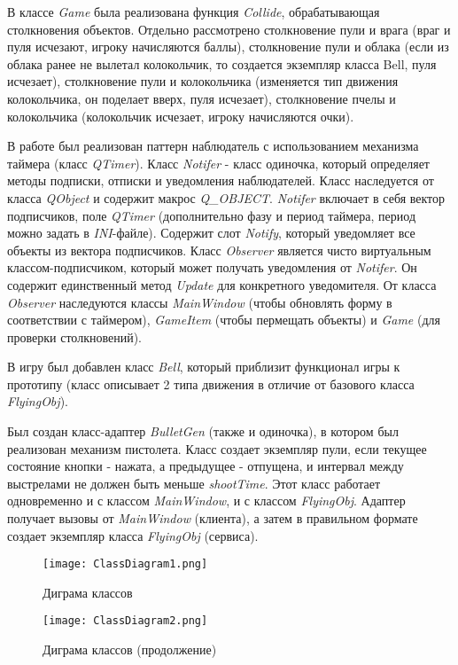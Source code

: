 \documentclass[a4paper,14pt]{article}
\begin{document}
В классе \textit{Game} была реализована функция \textit{Collide}, обрабатывающая столкновения объектов. Отдельно рассмотрено столкновение пули и врага (враг и пуля исчезают, игроку начисляются баллы), столкновение пули и облака (если из облака ранее не вылетал колокольчик, то создается экземпляр класса Bell, пуля исчезает), столкновение пули и колокольчика (изменяется тип движения колокольчика, он поделает вверх, пуля исчезает), столкновение пчелы и колокольчика (колокольчик исчезает, игроку начисляются очки).

В работе был реализован паттерн наблюдатель с использованием механизма таймера (класс \textit{QTimer}). Класс \textit{Notifer} - класс одиночка, который определяет методы подписки, отписки и уведомления наблюдателей. Класс наследуется от класса \textit{QObject} и содержит макрос \textit{Q\_OBJECT}. \textit{Notifer} включает в себя вектор подписчиков, поле \textit{QTimer} (дополнительно фазу и период таймера, период можно задать в \textit{INI}-файле). Содержит слот \textit{Notify}, который уведомляет все объекты из вектора подписчиков. Класс \textit{Observer} является чисто виртуальным классом-подписчиком, который может получать уведомления от \textit{Notifer}. Он содержит единственный метод \textit{Update} для конкретного уведомителя. От класса \textit{Observer} наследуются классы \textit{MainWindow} (чтобы обновлять форму в соответствии с таймером), \textit{GameItem} (чтобы пермещать объекты) и \textit{Game} (для проверки столкновений).

В игру был добавлен класс \textit{Bell}, который приблизит функционал игры к прототипу (класс описывает 2 типа движения в отличие от базового класса \textit{FlyingObj}). 

Был создан класс-адаптер \textit{BulletGen} (также и одиночка), в котором был реализован механизм пистолета. Класс создает экземпляр пули, если текущее состояние кнопки - нажата, а предыдущее - отпущена, и интервал между выстрелами не должен быть меньше \textit{shootTime}. Этот класс работает одновременно и с классом \textit{MainWindow}, и с классом \textit{FlyingObj}. Адаптер получает вызовы от \textit{MainWindow} (клиента), а затем в правильном формате создает экземпляр класса \textit{FlyingObj} (сервиса).

\begin{figure}[H]
	\centering
	\texttt{[image: ClassDiagram1.png]}
	\caption{Диграма классов}	
\end{figure}
\begin{figure}[H]
	\centering
	\texttt{[image: ClassDiagram2.png]}
	\caption{Диграма классов (продолжение)}	
\end{figure}
\end{document}
